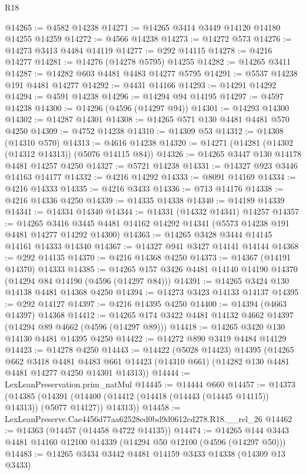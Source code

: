 \begin{lexlean}{R18}
\begin{coremodule}
@14265 := @4582 @14238
@14271 := @14265 @3414 @3449 @14120 @14180 @14255 @14259
@14272 := @4566 @14238
@14273 := @14272 @573
@14276 := @14273 @3413 @4484 @14119
@14277 := @292 @14115
@14278 := @4216 @14277
@14281 := @14276 (@14278 @5795) @14255
@14282 := @14265 @3411
@14287 := @14282 @603 @4481 @4483 @14277 @5795
@14291 := @5537 @14238 @191 @4481 @14277
@14292 := @4431 @14166
@14293 := @14291 @14292
@14294 := @4591 @14238
@14296 := @14294 @94 @14195
@14297 := @4597 @14238
@14300 := @14296 (@4596 (@14297 @94))
@14301 := @14293 @14300
@14302 := @14287 @14301
@14308 := @14265 @571 @130 @4481 @4481 @570 @4250
@14309 := @4752 @14238
@14310 := @14309 @53
@14312 := @14308 (@14310 @570)
@14313 := @4616 @14238
@14320 := @14271 (@14281 (@14302 (@14312 @14313)) (@5076 @14115 @84))
@14326 := @14265 @3447 @130 @14178 @4481 @14257 @4250
@14327 := @5721 @14238
@14331 := @14327 @923 @3446 @14163 @14177
@14332 := @4216 @14292
@14333 := @8091 @14169
@14334 := @4216 @14333
@14335 := @4216 @3433
@14336 := @713 @14176
@14338 := @4216 @14336 @4250
@14339 := @14335 @14338
@14340 := @14189 @14339
@14341 := @14334 @14340
@14344 := @14331 (@14332 @14341) @14257
@14357 := @14265
    @3416
    @3445
    @4481
    @14162
    @14292
    @14341
    (@5573 @14238 @191 @4481 @14277 @14292 @14300)
@14363 := @14265 @3428 @3444 @14145 @14161 @14333 @14340
@14367 := @14327 @941 @3427 @14141 @14144
@14368 := @292 @14135
@14370 := @4216 @14368 @4250
@14373 := @14367 (@14191 @14370) @14333
@14385 := @14265 @157 @3426 @4481 @14140 @14190 @14370 (@14294 @84 @14190 (@4596 (@14297 @84)))
@14391 := @14265 @3424 @130 @14138 @4481 @14368 @4250
@14394 := @14273 @3423 @14133 @14137
@14395 := @292 @14127
@14397 := @4216 @14395 @4250
@14400 := @14394 (@4663 @14397) @14368
@14412 := @14265 @174 @3422 @4481 @14132 @4662 @14397 (@14294 @89 @4662 (@4596 (@14297 @89)))
@14418 := @14265 @3420 @130 @14130 @4481 @14395 @4250
@14422 := @14272 @890 @3419 @4484 @14129
@14423 := @14278 @4250
@14443 := @14422
    (@5028 @14423)
    @14395
    (@14265
      @662
      @3418
      @4481
      @4483
      @661
      @14423
      (@14310 @661)
      (@14282 @130 @4481 @4481 @14277 @4250 @14301 @14313))
@14444 := LexLeanPreservation.prim_natMul
@14445 := @14444 @660
@14457 := @14373
    (@14385
      (@14391 (@14400 (@14412 (@14418 (@14443 (@14445 @14115)) @14313)) (@5077 @14127)) @14313))
@14458 := LexLeanPreserve.Cae4456d77aa62528ed0bd9d0612cd278.R18.__rel_26
@14462 := @14363 (@14457 (@14458 @4722 @14135))
@14474 := @14265 @144 @3443 @4481 @14160 @12100 @14339 (@14294 @50 @12100 (@4596 (@14297 @50)))
@14483 := @14265 @3434 @3442 @4481 @14159 @3433 @14338 (@14309 @13 @3433)

\end{coremodule}
\end{lexlean}
